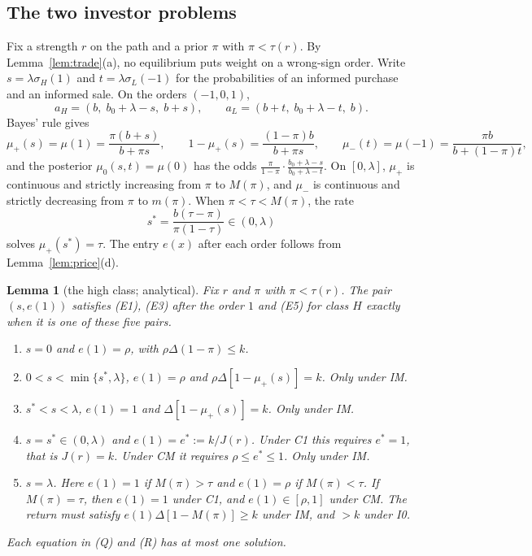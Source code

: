 \documentclass[11pt]{article}
\newtheorem{lemma}{Lemma}
\theoremstyle{definition}
\begin{document}
\subsection{The two investor problems}

Fix a strength $r$ on the path and a prior $\pi$ with $\pi<\tau(r)$. By Lemma~\ref{lem:trade}(a), no equilibrium
puts weight on a wrong-sign order. Write $s=\lambda\sigma_H(1)$ and $t=\lambda\sigma_L(-1)$ for the probabilities
of an informed purchase and an informed sale. On the orders $(-1,0,1)$,
\[
a_H=(b,\;b_0+\lambda-s,\;b+s),\qquad a_L=(b+t,\;b_0+\lambda-t,\;b).
\]
Bayes' rule gives
\[
\mu_+(s)=\mu(1)=\frac{\pi(b+s)}{b+\pi s},\qquad 1-\mu_+(s)=\frac{(1-\pi)b}{b+\pi s},\qquad
\mu_-(t)=\mu(-1)=\frac{\pi b}{b+(1-\pi)t},
\]
and the posterior $\mu_0(s,t)=\mu(0)$ has the odds $\frac{\pi}{1-\pi}\cdot\frac{b_0+\lambda-s}{b_0+\lambda-t}$.
On $[0,\lambda]$, $\mu_+$ is continuous and strictly increasing from $\pi$ to $M(\pi)$, and $\mu_-$ is continuous
and strictly decreasing from $\pi$ to $m(\pi)$. When $\pi<\tau<M(\pi)$, the rate
\[
s^*=\frac{b(\tau-\pi)}{\pi(1-\tau)}\in(0,\lambda)
\]
solves $\mu_+(s^*)=\tau$. The entry $e(x)$ after each order follows from Lemma~\ref{lem:price}(d).

\begin{lemma}[the high class; analytical]\label{lem:H}
Fix $r$ and $\pi$ with $\pi<\tau(r)$. The pair $(s,e(1))$ satisfies (E1), (E3) after the order $1$ and (E5) for
class $H$ exactly when it is one of these five pairs.
\begin{enumerate}[label=(\Alph*)]
\item[(N)] $s=0$ and $e(1)=\rho$, with $\rho\Delta(1-\pi)\le k$.
\item[(Q)] $0<s<\min\{s^*,\lambda\}$, $e(1)=\rho$ and $\rho\Delta[1-\mu_+(s)]=k$. Only under IM.
\item[(R)] $s^*<s<\lambda$, $e(1)=1$ and $\Delta[1-\mu_+(s)]=k$. Only under IM.
\item[(T)] $s=s^*\in(0,\lambda)$ and $e(1)=e^*:=k/J(r)$. Under C1 this requires $e^*=1$, that is $J(r)=k$.
  Under CM it requires $\rho\le e^*\le1$. Only under IM.
\item[(F)] $s=\lambda$. Here $e(1)=1$ if $M(\pi)>\tau$ and $e(1)=\rho$ if $M(\pi)<\tau$. If $M(\pi)=\tau$,
  then $e(1)=1$ under C1, and $e(1)\in[\rho,1]$ under CM. The return must satisfy $e(1)\Delta[1-M(\pi)]\ge k$
  under IM, and $>k$ under I0.
\end{enumerate}
Each equation in (Q) and (R) has at most one solution.
\end{lemma}
\end{document}

